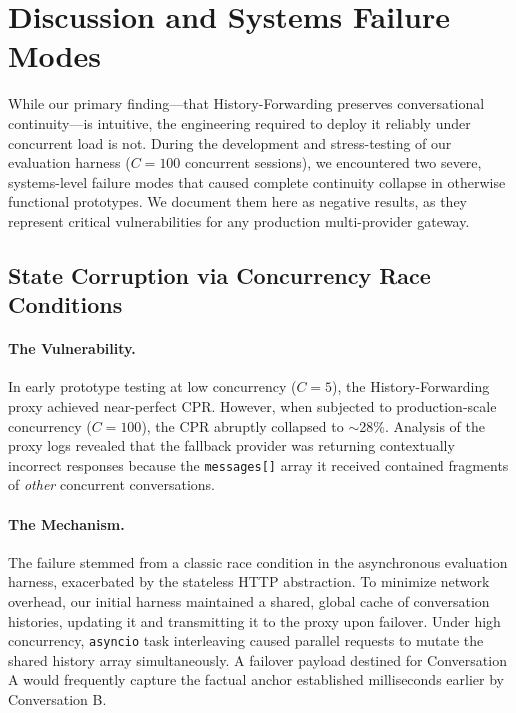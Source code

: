 \section{Discussion and Systems Failure Modes}
\label{sec:discussion}

While our primary finding---that History-Forwarding preserves conversational continuity---is intuitive, the engineering required to deploy it reliably under concurrent load is not. During the development and stress-testing of our evaluation harness ($C=100$ concurrent sessions), we encountered two severe, systems-level failure modes that caused complete continuity collapse in otherwise functional prototypes. We document them here as negative results, as they represent critical vulnerabilities for any production multi-provider gateway.

\subsection{State Corruption via Concurrency Race Conditions}

\paragraph{The Vulnerability.} 
In early prototype testing at low concurrency ($C=5$), the History-Forwarding proxy achieved near-perfect CPR. However, when subjected to production-scale concurrency ($C=100$), the CPR abruptly collapsed to $\sim$28\%. Analysis of the proxy logs revealed that the fallback provider was returning contextually incorrect responses because the \texttt{messages[]} array it received contained fragments of \textit{other} concurrent conversations. 

\paragraph{The Mechanism.}
The failure stemmed from a classic race condition in the asynchronous evaluation harness, exacerbated by the stateless HTTP abstraction. To minimize network overhead, our initial harness maintained a shared, global cache of conversation histories, updating it and transmitting it to the proxy upon failover. Under high concurrency, \texttt{asyncio} task interleaving caused parallel requests to mutate the shared history array simultaneously. A failover payload destined for Conversation A would frequently capture the factual anchor established milliseconds earlier by Conversation B.

